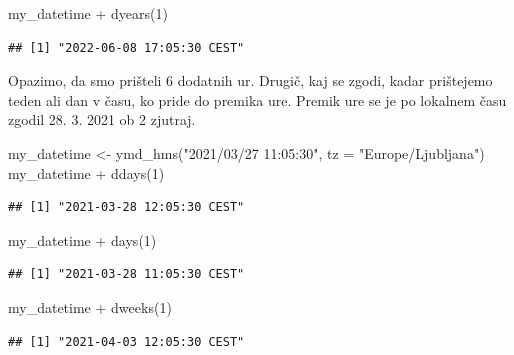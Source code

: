 \documentclass[
]{book}
\newenvironment{Shaded}{\begin{snugshade}}{\end{snugshade}}
\newcommand{\AttributeTok}[1]{\textcolor[rgb]{0.77,0.63,0.00}{#1}}
\newcommand{\DecValTok}[1]{\textcolor[rgb]{0.00,0.00,0.81}{#1}}
\newcommand{\FunctionTok}[1]{\textcolor[rgb]{0.00,0.00,0.00}{#1}}
\newcommand{\NormalTok}[1]{#1}
\newcommand{\OtherTok}[1]{\textcolor[rgb]{0.56,0.35,0.01}{#1}}
\newcommand{\SpecialCharTok}[1]{\textcolor[rgb]{0.00,0.00,0.00}{#1}}
\newcommand{\StringTok}[1]{\textcolor[rgb]{0.31,0.60,0.02}{#1}}
\begin{document}
\begin{Shaded}
\begin{Highlighting}[]
\NormalTok{my\_datetime }\SpecialCharTok{+} \FunctionTok{dyears}\NormalTok{(}\DecValTok{1}\NormalTok{)}
\end{Highlighting}
\end{Shaded}

\begin{verbatim}
## [1] "2022-06-08 17:05:30 CEST"
\end{verbatim}

Opazimo, da smo prišteli 6 dodatnih ur. Drugič, kaj se zgodi, kadar prištejemo teden ali dan v času, ko pride do premika ure. Premik ure se je po lokalnem času zgodil 28. 3. 2021 ob 2 zjutraj.

\begin{Shaded}
\begin{Highlighting}[]
\NormalTok{my\_datetime }\OtherTok{\textless{}{-}} \FunctionTok{ymd\_hms}\NormalTok{(}\StringTok{"2021/03/27 11:05:30"}\NormalTok{, }\AttributeTok{tz =} \StringTok{"Europe/Ljubljana"}\NormalTok{)}
\NormalTok{my\_datetime }\SpecialCharTok{+} \FunctionTok{ddays}\NormalTok{(}\DecValTok{1}\NormalTok{)}
\end{Highlighting}
\end{Shaded}

\begin{verbatim}
## [1] "2021-03-28 12:05:30 CEST"
\end{verbatim}

\begin{Shaded}
\begin{Highlighting}[]
\NormalTok{my\_datetime }\SpecialCharTok{+} \FunctionTok{days}\NormalTok{(}\DecValTok{1}\NormalTok{)}
\end{Highlighting}
\end{Shaded}

\begin{verbatim}
## [1] "2021-03-28 11:05:30 CEST"
\end{verbatim}

\begin{Shaded}
\begin{Highlighting}[]
\NormalTok{my\_datetime }\SpecialCharTok{+} \FunctionTok{dweeks}\NormalTok{(}\DecValTok{1}\NormalTok{)}
\end{Highlighting}
\end{Shaded}

\begin{verbatim}
## [1] "2021-04-03 12:05:30 CEST"
\end{verbatim}
\end{document}
